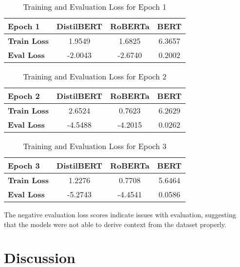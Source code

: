 \documentclass[conference]{IEEEtran}
\begin{document}
    \begin{table}[h]
        \centering
        \begin{tabular}{|l|c|c|c|}
            \hline
            \textbf{Epoch 1} & \textbf{DistilBERT} & \textbf{RoBERTa} & \textbf{BERT} \\ \hline
            \textbf{Train Loss} & 1.9549 & 1.6825 & 6.3657 \\ \hline
            \textbf{Eval Loss} & -2.0043 & -2.6740 & 0.2002 \\ \hline
        \end{tabular}
        \caption{Training and Evaluation Loss for Epoch 1}
        \label{tab:losses-epoch1}
    \end{table}

    \begin{table}[h]
        \centering
        \begin{tabular}{|l|c|c|c|}
            \hline
            \textbf{Epoch 2} & \textbf{DistilBERT} & \textbf{RoBERTa} & \textbf{BERT} \\ \hline
            \textbf{Train Loss} & 2.6524 & 0.7623 & 6.2629 \\ \hline
            \textbf{Eval Loss} & -4.5488 & -4.2015 & 0.0262 \\ \hline
        \end{tabular}
        \caption{Training and Evaluation Loss for Epoch 2}
        \label{tab:losses-epoch2}
    \end{table}

    \begin{table}[h]
        \centering
        \begin{tabular}{|l|c|c|c|}
            \hline
            \textbf{Epoch 3} & \textbf{DistilBERT} & \textbf{RoBERTa} & \textbf{BERT} \\ \hline
            \textbf{Train Loss} & 1.2276 & 0.7708 & 5.6464 \\ \hline
            \textbf{Eval Loss} & -5.2743 & -4.4541 & 0.0586 \\ \hline
        \end{tabular}
        \caption{Training and Evaluation Loss for Epoch 3}
        \label{tab:losses-epoch3}
    \end{table}

    The negative evaluation loss scores indicate issues with evaluation, suggesting that the models were not able to derive context from the dataset properly.


\section{Discussion}
\end{document}
